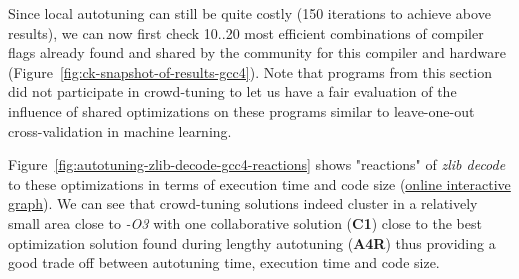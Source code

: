 Since local autotuning can still be quite costly (150 iterations to achieve above results),
we can now first check 10..20 most efficient combinations of compiler flags 
already found and shared by the community for this compiler and hardware
(Figure~\ref{fig:ck-snapshot-of-results-gcc4}).
%
Note that programs from this section did not participate in crowd-tuning
to let us have a fair evaluation of the influence of shared optimizations 
on these programs similar to leave-one-out cross-validation in machine learning.

Figure~\ref{fig:autotuning-zlib-decode-gcc4-reactions} shows "reactions" 
of \textit{zlib decode} to these optimizations in terms of execution time and code size 
(\href{http://cknowledge.org/repo/web.php?wcid=graph:47f0b282396776c4&subgraph=rpi3-autotuning-zlib-decode-gcc4-reactions-interactive}{online interactive graph}).
%
We can see that crowd-tuning solutions indeed cluster in a relatively small area 
close to \textit{-O3} with one collaborative solution (\textbf{C1}) close to the 
best optimization solution found during lengthy autotuning (\textbf{A4R}) 
thus providing a good trade off between autotuning time, execution time and code size.

